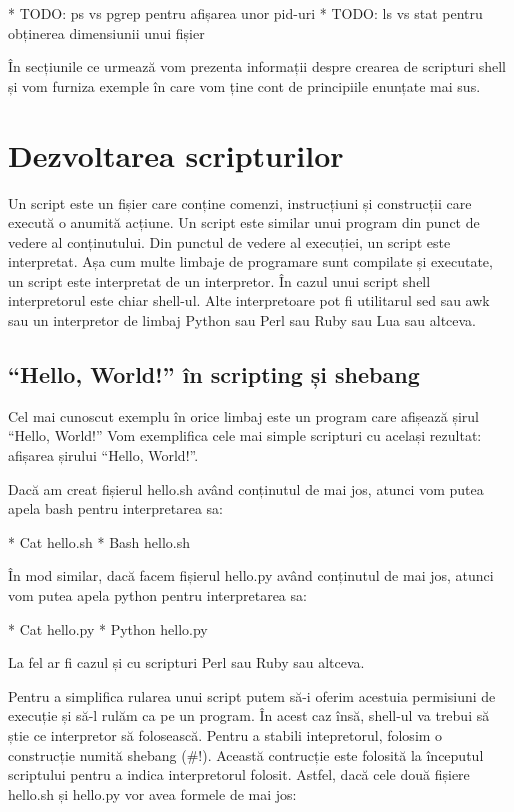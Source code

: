 * TODO: ps vs pgrep pentru afișarea unor pid-uri
* TODO: ls vs stat pentru obținerea dimensiunii unui fișier

În secțiunile ce urmează vom prezenta informații despre crearea de scripturi
shell și vom furniza exemple în care vom ține cont de principiile enunțate mai
sus.

\section{Dezvoltarea scripturilor}
\label{sec:auto-dev}

Un script este un fișier care conține comenzi, instrucțiuni și construcții care
execută o anumită acțiune. Un script este similar unui program din punct de
vedere al conținutului. Din punctul de vedere al execuției, un script este
interpretat. Așa cum multe limbaje de programare sunt compilate și executate, un
script este interpretat de un interpretor. În cazul unui script shell
interpretorul este chiar shell-ul. Alte interpretoare pot fi utilitarul sed sau
awk sau un interpretor de limbaj Python sau Perl sau Ruby sau Lua sau altceva.

\subsection{“Hello, World!” în scripting și shebang}
\label{sec:auto-dev-hello}

Cel mai cunoscut exemplu în orice limbaj este un program care afișează șirul
“Hello, World!” Vom exemplifica cele mai simple scripturi cu același rezultat:
afișarea șirului “Hello, World!”.

Dacă am creat fișierul hello.sh având conținutul de mai jos, atunci vom putea
apela bash pentru interpretarea sa:

* Cat hello.sh
* Bash hello.sh

În mod similar, dacă facem fișierul hello.py având conținutul de mai jos, atunci
vom putea apela python pentru interpretarea sa:

* Cat hello.py
* Python hello.py

La fel ar fi cazul și cu scripturi Perl sau Ruby sau altceva.

Pentru a simplifica rularea unui script putem să-i oferim acestuia permisiuni de
execuție și să-l rulăm ca pe un program. În acest caz însă, shell-ul va trebui
să știe ce interpretor să folosească. Pentru a stabili intepretorul, folosim o
construcție numită shebang (\#!). Această contrucție este folosită la începutul
scriptului pentru a indica interpretorul folosit. Astfel, dacă cele două fișiere
hello.sh și hello.py vor avea formele de mai jos:

